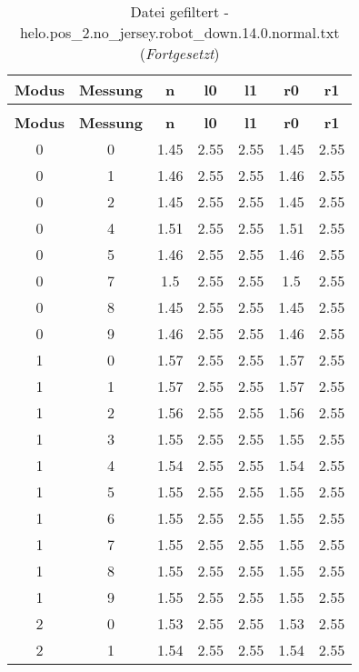 \clearpage{}
\begin{longtable}{|c|c||c||c|c||c|c|}
	\caption{Datei gefiltert - helo.pos\_2.no\_jersey.robot\_down.14.0.normal.txt} \label{tab:helo.pos-2.no-jersey.robot-down.14.0.normal.txt} \\ \hline
	\textbf{Modus} & \textbf{Messung} & \textbf{n} & \textbf{l0} & \textbf{l1} & \textbf{r0} & \textbf{r1}\\ \hline
	\endfirsthead
	\caption[]{Datei gefiltert - helo.pos\_2.no\_jersey.robot\_down.14.0.normal.txt (\emph{Fortgesetzt})} \\ \hline
	\textbf{Modus} & \textbf{Messung} & \textbf{n} & \textbf{l0} & \textbf{l1} & \textbf{r0} & \textbf{r1}\\ \hline
	\endhead
	0 & 0 & 1.45 & 2.55 & 2.55 & 1.45 & 2.55 \\ \hline
	0 & 1 & 1.46 & 2.55 & 2.55 & 1.46 & 2.55 \\ \hline
	0 & 2 & 1.45 & 2.55 & 2.55 & 1.45 & 2.55 \\ \hline
	0 & 4 & 1.51 & 2.55 & 2.55 & 1.51 & 2.55 \\ \hline
	0 & 5 & 1.46 & 2.55 & 2.55 & 1.46 & 2.55 \\ \hline
	0 & 7 & 1.5 & 2.55 & 2.55 & 1.5 & 2.55 \\ \hline
	0 & 8 & 1.45 & 2.55 & 2.55 & 1.45 & 2.55 \\ \hline
	0 & 9 & 1.46 & 2.55 & 2.55 & 1.46 & 2.55 \\ \hline
	1 & 0 & 1.57 & 2.55 & 2.55 & 1.57 & 2.55 \\ \hline
	1 & 1 & 1.57 & 2.55 & 2.55 & 1.57 & 2.55 \\ \hline
	1 & 2 & 1.56 & 2.55 & 2.55 & 1.56 & 2.55 \\ \hline
	1 & 3 & 1.55 & 2.55 & 2.55 & 1.55 & 2.55 \\ \hline
	1 & 4 & 1.54 & 2.55 & 2.55 & 1.54 & 2.55 \\ \hline
	1 & 5 & 1.55 & 2.55 & 2.55 & 1.55 & 2.55 \\ \hline
	1 & 6 & 1.55 & 2.55 & 2.55 & 1.55 & 2.55 \\ \hline
	1 & 7 & 1.55 & 2.55 & 2.55 & 1.55 & 2.55 \\ \hline
	1 & 8 & 1.55 & 2.55 & 2.55 & 1.55 & 2.55 \\ \hline
	1 & 9 & 1.55 & 2.55 & 2.55 & 1.55 & 2.55 \\ \hline
	2 & 0 & 1.53 & 2.55 & 2.55 & 1.53 & 2.55 \\ \hline
	2 & 1 & 1.54 & 2.55 & 2.55 & 1.54 & 2.55 \\ \hline

\end{longtable}
